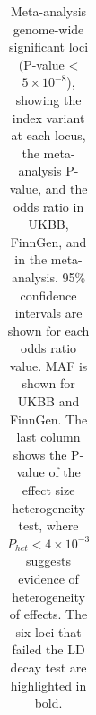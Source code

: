     \begin{table}[H]

      \centering

      \caption[Genome-wide significant index variants from the UKBB and FinnGen pAD GWAS meta-analysis]{\label{tab:table:meta_gws}Meta-analysis genome-wide significant loci (P-value < $5\times10^{-8}$), showing the index variant at each locus, the meta-analysis P-value, and the odds ratio in UKBB, FinnGen, and in the meta-analysis. 95\% confidence intervals are shown for each odds ratio value. MAF is shown for UKBB and FinnGen. The last column shows the P-value of the effect size heterogeneity test, where $P_{het} < 4\times10^{-3}$ suggests evidence of heterogeneity of effects. The six loci that failed the LD decay test are highlighted in bold.}
      \fontsize{8.5}{11}\selectfont
      \begin{adjustwidth}{-.1in}{-.5in}  

      \begin{tabular}[t]{p{}llllp{}p{}p{}}


\end{tabular}
\end{adjustwidth}
\end{table}
